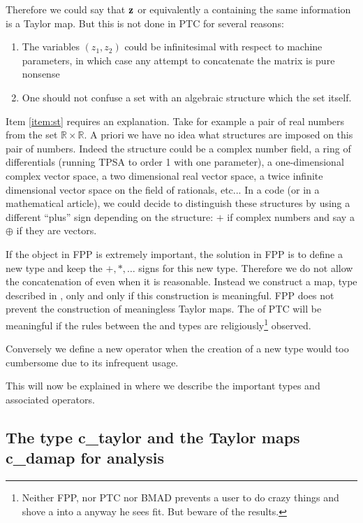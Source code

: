 \documentclass[english,12pt,article]{article} %
\begin{document}
{Therefore we could say that ${\bf z}$ or equivalently a  containing the same information is a Taylor map. But this is not done in PTC for several reasons:

\begin{enumerate}
\item The variables  $(z_1,z_2)$ could  be  infinitesimal with respect to machine parameters, in which case any attempt to concatenate the matrix is pure nonsense 
\item\label{item:st}  One should not confuse a set with an algebraic structure which  the  set itself.
\end{enumerate}

Item \ref{item:st} requires an explanation. Take for example  a pair of real numbers from the set  $\mathbb{R} \times \mathbb{R}$.  A priori we have no idea what structures are imposed on this pair of numbers. Indeed the structure could be    a complex number field, a ring of differentials (running TPSA to order 1 with one parameter),  a one-dimensional complex vector space, a two dimensional real vector space, a twice infinite dimensional  vector space on the field of rationals, etc... In a code (or in a mathematical article), we could decide to  distinguish these structures by using a different ``plus'' sign depending on the structure: $+$ if complex numbers and say a $\oplus$ if they are vectors. 

If the object in FPP is extremely important, the solution in FPP is to define  a new type and  keep the $+,*,\ldots $ signs for this new type.  Therefore we do not allow the concatenation of  even when it is reasonable. Instead we construct a map, type  described in , only and only if this construction is meaningful.  FPP does not prevent the construction of meaningless Taylor maps. The   of PTC will be meaningful if the rules between the  and   types are religiously\footnote{Neither FPP, nor PTC nor  BMAD prevents  a user to do crazy things and shove a   into a   anyway he sees fit. But beware of the results.}  observed.  

Conversely we define a new operator when the creation of a new type would too cumbersome due to its infrequent usage.

This will now be explained in  where  we describe  the important types and associated operators.


\subsection{The type c_taylor and the Taylor maps c_damap for analysis}\label{sec:raymap}
 
}
\end{document}
